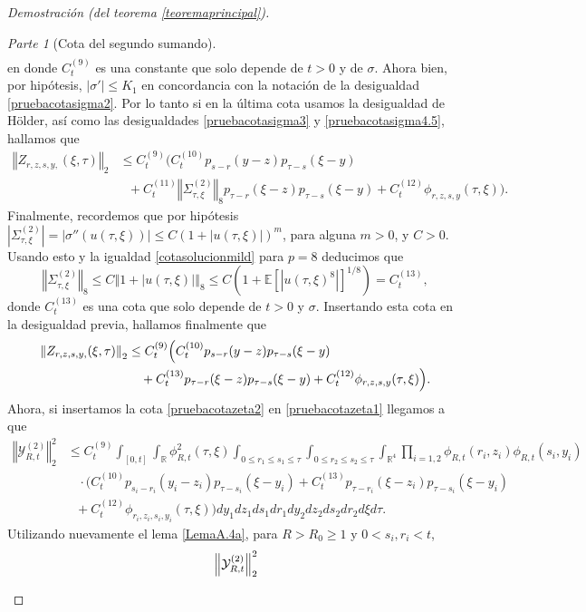 \documentclass[letterpaper,twoside,12pt]{book}
\newcommand{\R}{\mathbb{R}}
\newcommand{\E}{\mathbb{E}}
\newcommand{\1}{\mathds{1}}
\newcommand{\abs}[1]{\left\lvert #1 \right\rvert}
\newcommand{\norm}[1]{\left\Vert #1 \right\Vert}
\theoremstyle{definition}
\theoremstyle{definition}
\theoremstyle{remark}
\newtheorem{proofpart}{Parte}
\theoremstyle{definition}
\theoremstyle{definition}
\theoremstyle{definition}
\theoremstyle{definition}
\theoremstyle{definition}
\begin{document}
\begin{proof}[Demostración (del teorema \ref{teoremaprincipal})]
\begin{proofpart}[Cota del segundo sumando]
\begin{align*}
\end{align*}
en donde $C_t^{(9)}$ es una constante que solo depende de $t>0$ y de $\sigma$. Ahora bien, por hipótesis, $|\sigma'|\leq K_1$ en concordancia con la notación de la desigualdad \eqref{pruebacotasigma2}. Por lo tanto si en la última cota usamos la desigualdad de Hölder, así como las desigualdades \eqref{pruebacotasigma3} y \eqref{pruebacotasigma4.5}, hallamos que 
\begin{align*}
   \norm{Z_{r,z,s,y,}(\xi,\tau)}_2&\leq C_t^{(9)}\Big(C^{(10)}_tp_{s-r}(y-z)p_{\tau-s}(\xi-y)\\
   &\ \ \ +C_t^{(11)}\norm{\Sigma_{\tau,\xi}^{(2)}}_8p_{\tau-r}(\xi-z)p_{\tau-s}(\xi-y)+C_t^{(12)}\phi_{r,z,s,y}(\tau,\xi)\Big).
\end{align*}
Finalmente, recordemos que por hipótesis $|\Sigma_{\tau,\xi}^{(2)}|=|\sigma''(u(\tau,\xi))|\leq C(1+|u(\tau,\xi)|)^{m}$, para alguna $m>0$, y $C>0$. Usando esto y la igualdad \eqref{cotasolucionmild} para $p=8$ deducimos que
\[
\norm{\Sigma_{\tau,\xi}^{(2)}}_8\leq C\norm{1+\abs{u(\tau,\xi)}}_8\leq C(1+\E\left[\abs{u(\tau,\xi)^8}\right]^{1/8})=C_t^{(13)},
\]
donde $C_t^{(13)}$ es una cota que solo depende de $t>0$ y $\sigma$. Insertando esta cota en la desigualdad previa, hallamos finalmente que 
\begin{align}
   \norm{Z_{r,z,s,y,}(\xi,\tau)}_2&\leq C_t^{(9)}\Big(C^{(10)}_tp_{s-r}(y-z)p_{\tau-s}(\xi-y)\notag\\
   &\ \ \ +C_t^{(13)}p_{\tau-r}(\xi-z)p_{\tau-s}(\xi-y)+C_t^{(12)}\phi_{r,z,s,y}(\tau,\xi)\Big)\label{pruebacotazeta2}.
\end{align}
Ahora, si insertamos la cota \eqref{pruebacotazeta2} en \eqref{pruebacotazeta1} llegamos a que 
\begin{align*}
   \norm{\mathcal{Y}_{R,t}^{(2)}}_2^{2}&\leq C_t^{(9)}\int_{[0,t]}\int_\R\phi_{R,t}^2(\tau,\xi)\int_{0\leq r_1\leq s_1\leq \tau}\int_{0\leq r_2\leq s_2\leq \tau}\int_{\R^4}\prod_{i=1,2}\phi_{R,t}(r_i,z_i)\phi_{R,t}(s_i,y_i)\\
   &\ \ \ \ \cdot \Big(C^{(10)}_tp_{s_i-r_i}(y_i-z_i)p_{\tau-s_i}(\xi-y_i)+C_t^{(13)}p_{\tau-r_i}(\xi-z_i)p_{\tau-s_i}(\xi-y_i)\\
   &\ \ \ +C_t^{(12)}\phi_{r_i,z_i,s_i,y_i}(\tau,\xi)\Big)  dy_1dz_1ds_1dr_1dy_2dz_2ds_2dr_2d\xi d\tau.
\end{align*}
Utilizando nuevamente el lema \ref{LemaA.4a}, para $R>R_0\geq1$ y $0<s_i,r_i<t$,
\begin{align}
   &\norm{\mathcal{Y}_{R,t}^{(2)}}_2^{2}\notag\\

\end{align}
\end{proofpart}
\end{proof}
\end{document}
